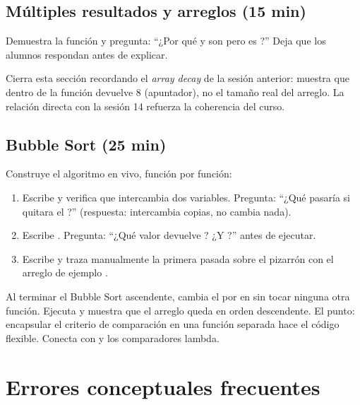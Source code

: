 \documentclass[12pt, oneside]{article}
\begin{document}
\subsection{Múltiples resultados y arreglos (15 min)}

Demuestra la función  y pregunta: ``¿Por qué  y
 son  pero  es ?''
Deja que los alumnos respondan antes de explicar.

Cierra esta sección recordando el \textit{array decay} de la sesión anterior:
muestra que dentro de la función  devuelve 8 (apuntador),
no el tamaño real del arreglo. La relación directa con la sesión 14 refuerza
la coherencia del curso.

\subsection{Bubble Sort (25 min)}

Construye el algoritmo en vivo, función por función:

\begin{enumerate}
  \item Escribe  y verifica que intercambia dos variables. Pregunta:
        ``¿Qué pasaría si quitara el \cpp{\&}?'' (respuesta: intercambia copias, no cambia nada).
  \item Escribe . Pregunta: ``¿Qué valor devuelve ?
        ¿Y ?'' antes de ejecutar.
  \item Escribe  y traza manualmente la primera pasada sobre el pizarrón
        con el arreglo de ejemplo .
\end{enumerate}

\begin{notaprofesor}
  Al terminar el Bubble Sort ascendente, cambia el \cpp{>} por \cpp{<} en
   sin tocar ninguna otra función. Ejecuta y muestra que el
  arreglo queda en orden descendente. El punto: encapsular el criterio de
  comparación en una función separada hace el código flexible. Conecta con
   y los comparadores lambda.
\end{notaprofesor}

\section{Errores conceptuales frecuentes}
\end{document}
